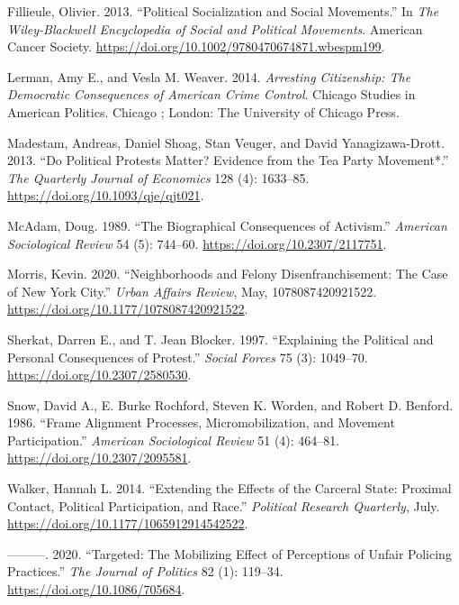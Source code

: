 \documentclass[
  12pt,
]{article}
\newlength{\cslhangindent}
\newenvironment{cslreferences}%
  {\setlength{\parindent}{0pt}%
  \everypar{\setlength{\hangindent}{\cslhangindent}}\ignorespaces}%
  {\par}
\begin{document}
\hypertarget{refs}{}
\begin{cslreferences}
\leavevmode\hypertarget{ref-Fillieule2013}{}%
Fillieule, Olivier. 2013. ``Political Socialization and Social Movements.'' In \emph{The Wiley-Blackwell Encyclopedia of Social and Political Movements}. American Cancer Society. \url{https://doi.org/10.1002/9780470674871.wbespm199}.

\leavevmode\hypertarget{ref-Lerman2014}{}%
Lerman, Amy E., and Vesla M. Weaver. 2014. \emph{Arresting Citizenship: The Democratic Consequences of American Crime Control}. Chicago Studies in American Politics. Chicago ; London: The University of Chicago Press.

\leavevmode\hypertarget{ref-Madestam2013}{}%
Madestam, Andreas, Daniel Shoag, Stan Veuger, and David Yanagizawa-Drott. 2013. ``Do Political Protests Matter? Evidence from the Tea Party Movement*.'' \emph{The Quarterly Journal of Economics} 128 (4): 1633--85. \url{https://doi.org/10.1093/qje/qjt021}.

\leavevmode\hypertarget{ref-McAdam1989}{}%
McAdam, Doug. 1989. ``The Biographical Consequences of Activism.'' \emph{American Sociological Review} 54 (5): 744--60. \url{https://doi.org/10.2307/2117751}.

\leavevmode\hypertarget{ref-Morris2020}{}%
Morris, Kevin. 2020. ``Neighborhoods and Felony Disenfranchisement: The Case of New York City.'' \emph{Urban Affairs Review}, May, 1078087420921522. \url{https://doi.org/10.1177/1078087420921522}.

\leavevmode\hypertarget{ref-Sherkat1997}{}%
Sherkat, Darren E., and T. Jean Blocker. 1997. ``Explaining the Political and Personal Consequences of Protest.'' \emph{Social Forces} 75 (3): 1049--70. \url{https://doi.org/10.2307/2580530}.

\leavevmode\hypertarget{ref-Snow1986}{}%
Snow, David A., E. Burke Rochford, Steven K. Worden, and Robert D. Benford. 1986. ``Frame Alignment Processes, Micromobilization, and Movement Participation.'' \emph{American Sociological Review} 51 (4): 464--81. \url{https://doi.org/10.2307/2095581}.

\leavevmode\hypertarget{ref-Walker2014}{}%
Walker, Hannah L. 2014. ``Extending the Effects of the Carceral State: Proximal Contact, Political Participation, and Race.'' \emph{Political Research Quarterly}, July. \url{https://doi.org/10.1177/1065912914542522}.

\leavevmode\hypertarget{ref-Walker2020}{}%
---------. 2020. ``Targeted: The Mobilizing Effect of Perceptions of Unfair Policing Practices.'' \emph{The Journal of Politics} 82 (1): 119--34. \url{https://doi.org/10.1086/705684}.
\end{cslreferences}
\end{document}
